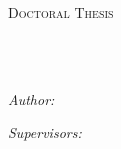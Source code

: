 \documentclass[
    11pt, %
    english, %
    onehalfspacing, %
    headsepline, %
]{MastersDoctoralThesis} %
\author{Jiaxin \textsc{Zhong}} %
\begin{document}
\frontmatter %

\pagestyle{plain} %

 

\begin{titlepage}
\begin{center}

\vspace*{.06\textheight}
{\scshape\LARGE \univname\par}\vspace{1.5cm} %
\textsc{\Large Doctoral Thesis}\\[0.5cm] %

\HRule \\[0.4cm] %
{\huge \bfseries \ttitle\par}\vspace{0.4cm} %
\HRule \\[1.5cm] %
 
\begin{minipage}[t]{0.4\textwidth}
\begin{flushleft} \large
\emph{Author:}\\
\href{http://jiaxinzhong.com/}{\authorname} %
\end{flushleft}
\end{minipage}
\begin{minipage}[t]{0.4\textwidth}
\begin{flushright} \large
\emph{Supervisors:} \\
{\supname} %
\end{flushright}
\end{minipage}\\[3cm]
 

\end{center}
\end{titlepage}
\end{document}
